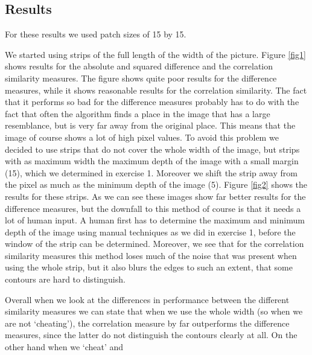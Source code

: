 \documentclass{article}
\begin{document}
\subsection{Results}
For these results we used patch sizes of 15 by 15.

We started using strips of the full length of the width of the picture. Figure \ref{fig1} shows results for the absolute and squared difference and the correlation similarity measures. The figure shows quite poor results for the difference measures, while it shows reasonable results for the correlation similarity. The fact that it performs so bad for the difference measures probably has to do with the fact that often the algorithm finds a place in the image that has a large resemblance, but is very far away from the original place. This means that the image of course shows a lot of high pixel values. To avoid this problem we decided to use strips that do not cover the whole width of the image, but strips with as maximum width the maximum depth of the image with a small margin (15), which we determined in exercise 1. Moreover we shift the strip away from the pixel as much as the minimum depth of the image (5). Figure \ref{fig2} shows the results for these strips. As we can see these images show far better results for the difference measures, but the downfall to this method of course is that it needs a lot of human input. A human first has to determine the maximum and minimum depth of the image using manual techniques as we did in exercise 1, before the window of the strip can be determined. Moreover, we see that for the correlation similarity measures this method loses much of the noise that was present when using the whole strip, but it also blurs the edges to such an extent, that some contours are hard to distinguish.

Overall when we look at the differences in performance between the different similarity measures we can state that when we use the whole width (so when we are not `cheating'), the correlation measure by far outperforms the difference measures, since the latter do not distinguish the contours clearly at all. On the other hand when we `cheat' and 
\end{document}
